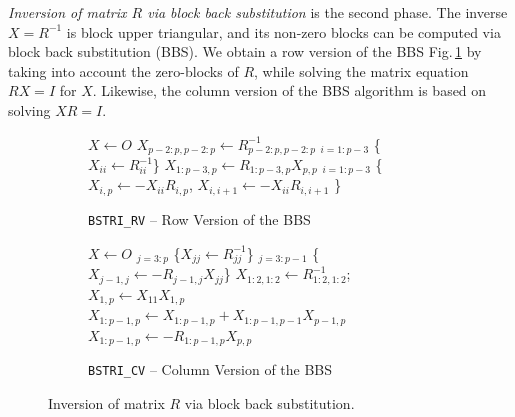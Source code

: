 \documentclass{llncs}
\begin{document}
\textit{Inversion of matrix $R$ via block back substitution} 
is the second phase. The inverse $X = R^{-1}$ is block upper triangular,
and its non-zero blocks can be computed
via block back substitution (BBS).
We obtain a row version of the BBS Fig.\,\ref{alg:BSTRI_RV}
by taking into account the zero-blocks of $R$,
while solving the matrix equation $R X = I$ for $X$. 
Likewise, the column version of the BBS algorithm is based on 
solving $X R = I$.
\begin{figure}[t]%
  \centering
  \begin{subfigure}[t]{0.45\linewidth}
    \begin{algorithm}[H]

      \BlankLine

      $X \gets O$\; 
      $X_{p-2:p,p-2:p}\gets R_{p-2:p,p-2:p}^{-1}$\;
      \Batched$_{i = 1:p-3}$ \{$X_{ii}\gets R_{ii}^{-1}$\} \;
      $X_{1:p-3,p}\gets R_{1:p-3,p} X_{p,p} $ \;
      \Batched$_{i = 1:p-3}$ \{$X_{i,p}\gets -X_{ii}  R_{i,p}$, $X_{i,i+1}\gets -X_{ii}  R_{i,i+1}$ \} \;
    \end{algorithm}    
    \caption{{\tt BSTRI\_RV} -- Row Version of the BBS
      \label{alg:BSTRI_RV}}
  \end{subfigure}
  \hfill
  \begin{subfigure}[t]{0.54\linewidth}
    \begin{algorithm}[H]

      \BlankLine

      $X \gets O$\; 
      \Batched$_{j = 3:p}$ \{$X_{jj}\gets R_{jj}^{-1}$\}\;
      \Batched$_{j = 3:p-1}$ \{$X_{j-1,j}\gets -R_{j-1,j} X_{jj} $\}\;
      $X_{1:2,1:2}\gets R_{1:2,1:2}^{-1}$; $X_{1,p}\gets X_{11} X_{1,p} $\;
      $X_{1:p-1,p}\gets X_{1:p-1,p} + X_{1:p-1,p-1} X_{p-1,p}$\;
      $X_{1:p-1,p}\gets -R_{1:p-1,p} X_{p,p} $\;%
    \end{algorithm}    
    \caption{{\tt BSTRI\_CV} -- Column Version of the BBS
      \label{alg:BSTRI_CV}}
  \end{subfigure}
  \caption[]{Inversion of matrix $R$ via block back substitution.\footnotemark
    \label{alg:BSTRI}}
\end{figure}
\end{document}
